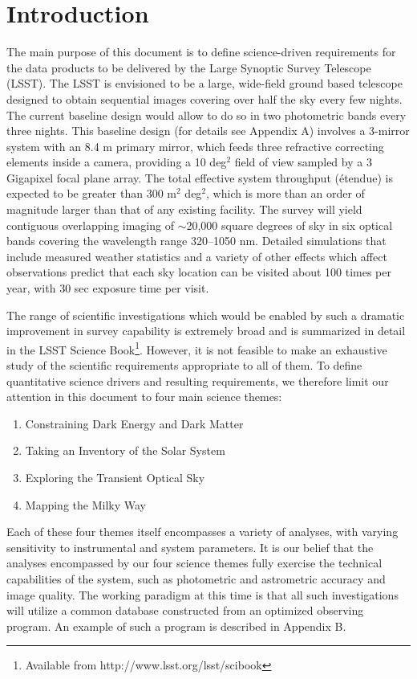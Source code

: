 \section{Introduction}

The main purpose of this document is to define science-driven requirements for the
data products to be delivered by the Large Synoptic Survey Telescope (LSST).
The LSST is envisioned to be a large, wide-field ground based telescope
designed to obtain sequential images covering over half the sky every few nights.
The current baseline design would allow to do so in two photometric bands every three
nights. This baseline design (for details see Appendix A) involves a 3-mirror system with an
8.4 m primary mirror, which feeds three refractive correcting elements inside a camera,
providing a 10 deg$^2$ field of view sampled by a 3 Gigapixel focal plane array.
The total effective system throughput (\'etendue) is expected to be greater than
300 m$^2$ deg$^2$,
which is more than an order of magnitude larger than that of any existing facility.
The survey will yield contiguous overlapping imaging of $\sim$20,000 square degrees
of sky in six optical bands covering the wavelength range 320--1050 nm.
Detailed simulations that include measured weather statistics and a variety
of other effects which affect observations predict that each sky location can be
visited about 100 times per year, with 30 sec exposure time per visit.

The range of scientific investigations which would be enabled by such a
dramatic improvement in survey capability is extremely broad and
is summarized in detail in the LSST Science Book\footnote{Available from
http://www.lsst.org/lsst/scibook}.  However, it is not feasible to make an exhaustive study of the scientific requirements
appropriate to all of them. To define quantitative science drivers and resulting requirements,
we therefore limit our attention in this document to four
main science themes:
\begin{enumerate}
\item Constraining Dark Energy and Dark Matter
\item Taking an Inventory of the Solar System
\item Exploring the Transient Optical Sky
\item Mapping the Milky Way
\end{enumerate}

Each of these four themes itself encompasses a variety of analyses, with
varying sensitivity to instrumental and system parameters.  It is our belief
that the analyses encompassed by our four science themes
fully exercise the technical capabilities of the system,
such as photometric and astrometric accuracy and image quality.  The working
paradigm at this time is that all such investigations will utilize a common
database constructed from an optimized observing program. An example of
such a program is described in Appendix B.

